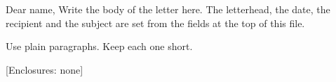 \documentclass{jupiter-letter}
\begin{document}
\begin{jpletter}{Dear name,}
Write the body of the letter here. The letterhead, the date, the recipient and the subject are set from the fields at the top of this file.

Use plain paragraphs. Keep each one short.
\end{jpletter}
[Enclosures: none]
\end{document}
